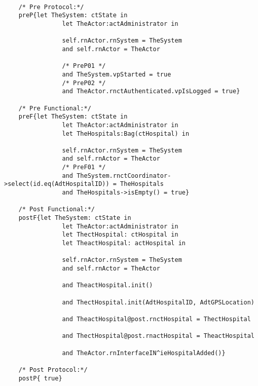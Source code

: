 	\scriptsize
	\vspace{0.5cm}
	\begin{lstlisting}[style=MessirStyle,firstnumber=auto,captionpos=b,caption={\msrmessir (MCL-oriented) specification of the operation \emph{oeAddHospital}.},label=OM-actAdministrator-oeAddHospital-MCL-LST]

	/* Pre Protocol:*/ 
	preP{let TheSystem: ctState in
	  			let TheActor:actAdministrator in
	  
				self.rnActor.rnSystem = TheSystem
				and self.rnActor = TheActor
	  
				/* PreP01 */
				and TheSystem.vpStarted = true
				/* PreP02 */
				and TheActor.rnctAuthenticated.vpIsLogged = true}
	
	/* Pre Functional:*/
	preF{let TheSystem: ctState in
	 			let TheActor:actAdministrator in
	  			let TheHospitals:Bag(ctHospital) in
	  
	  			self.rnActor.rnSystem = TheSystem
	  			and self.rnActor = TheActor
				/* PreF01 */
	  			and TheSystem.rnctCoordinator->select(id.eq(AdtHospitalID)) = TheHospitals
				and TheHospitals->isEmpty() = true}
	
	/* Post Functional:*/ 
	postF{let TheSystem: ctState in
	  			let TheActor:actAdministrator in
	  			let ThectHospital: ctHospital in
	  			let TheactHospital: actHospital in
	  
				self.rnActor.rnSystem = TheSystem
				and self.rnActor = TheActor
				
				and TheactHospital.init()
				
				and ThectHospital.init(AdtHospitalID, AdtGPSLocation)
				
				and TheactHospital@post.rnctHospital = ThectHospital
				
				and ThectHospital@post.rnactHospital = TheactHospital
				
				and TheActor.rnInterfaceIN^ieHospitalAdded()}
	
	/* Post Protocol:*/ 
	postP{ true}
	
	\end{lstlisting}
	\normalsize 
	
	
	
	





